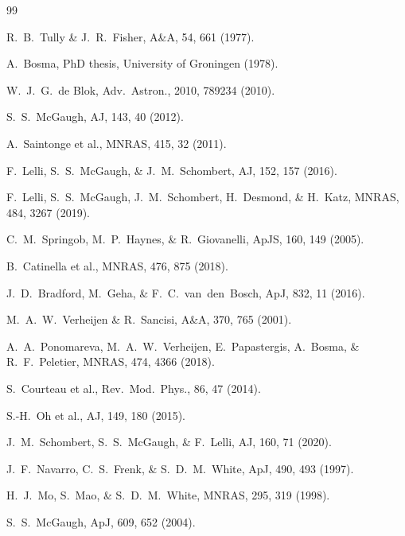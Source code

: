 \documentclass[11pt]{article}
\begin{document}
\begin{thebibliography}{99}

R.~B.~Tully \& J.~R.~Fisher, A\&A, 54, 661 (1977).

A.~Bosma, PhD thesis, University of Groningen (1978).

W.~J.~G.~de Blok, Adv.~Astron., 2010, 789234 (2010).

S.~S.~McGaugh, AJ, 143, 40 (2012).

A.~Saintonge et al., MNRAS, 415, 32 (2011).

F.~Lelli, S.~S.~McGaugh, \& J.~M.~Schombert, AJ, 152, 157 (2016).

F.~Lelli, S.~S.~McGaugh, J.~M.~Schombert, H.~Desmond, \& H.~Katz, MNRAS, 484, 3267 (2019).

C.~M.~Springob, M.~P.~Haynes, \& R.~Giovanelli, ApJS, 160, 149 (2005).

B.~Catinella et al., MNRAS, 476, 875 (2018).

J.~D.~Bradford, M.~Geha, \& F.~C.~van~den~Bosch, ApJ, 832, 11 (2016).

M.~A.~W.~Verheijen \& R.~Sancisi, A\&A, 370, 765 (2001).

A.~A.~Ponomareva, M.~A.~W.~Verheijen, E.~Papastergis, A.~Bosma, \& R.~F.~Peletier, MNRAS, 474, 4366 (2018).

S.~Courteau et al., Rev.~Mod.~Phys., 86, 47 (2014).

S.-H.~Oh et al., AJ, 149, 180 (2015).

J.~M.~Schombert, S.~S.~McGaugh, \& F.~Lelli, AJ, 160, 71 (2020).

J.~F.~Navarro, C.~S.~Frenk, \& S.~D.~M.~White, ApJ, 490, 493 (1997).

H.~J.~Mo, S.~Mao, \& S.~D.~M.~White, MNRAS, 295, 319 (1998).

S.~S.~McGaugh, ApJ, 609, 652 (2004).


\end{thebibliography}
\end{document}
